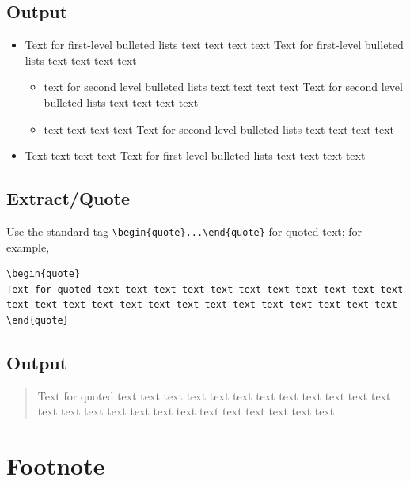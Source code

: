 \documentclass[]{imag-ms-template}
\begin{document}
\subsection*{Output}

\begin{itemize}
\item Text for first-level bulleted lists text text text text Text for first-level bulleted lists text text text text 
\begin{itemize}
\item text for second level bulleted lists text text text text Text for second level bulleted lists text text text text 
\item text text text text Text for second level bulleted lists text text text text 
\end{itemize}
\item Text text text text Text for first-level bulleted lists text text text text 
\end{itemize}

\subsection*{Extract/Quote}

Use the standard tag \verb!\begin{quote}...\end{quote}! for quoted text; for example,

\begin{verbatim}
\begin{quote}
Text for quoted text text text text text text text text text text text
text text text text text text text text text text text text text text 
\end{quote}
\end{verbatim}

\subsection*{Output}

\begin{quote}
Text for quoted text text text text text text text text text text text
text text text text text text text text text text text text text text 
\end{quote}

\section{Footnote}
\end{document}
